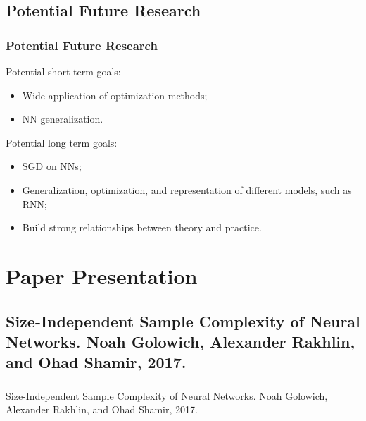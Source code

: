 \documentclass{beamer}
\begin{document}
\subsection{Potential Future Research}
\begin{frame}
\frametitle{Potential Future Research}
Potential short term goals:
\begin{itemize}
    \item Wide application of optimization methods;
    \item NN generalization.
\end{itemize}

Potential long term goals:
\begin{itemize}
    \item SGD on NNs;
    \item Generalization, optimization, and representation of different models, such as RNN;
    \item Build strong relationships between theory and practice.
\end{itemize}
\end{frame}


\section{Paper Presentation}


\subsection{Size-Independent Sample Complexity of Neural Networks. Noah Golowich, Alexander Rakhlin, and Ohad Shamir, 2017.}
\begin{frame}
\frametitle{\phantom{}}
\Large Size-Independent Sample Complexity of Neural Networks. Noah Golowich, Alexander Rakhlin, and Ohad Shamir, 2017.
\end{frame}
\end{document}
